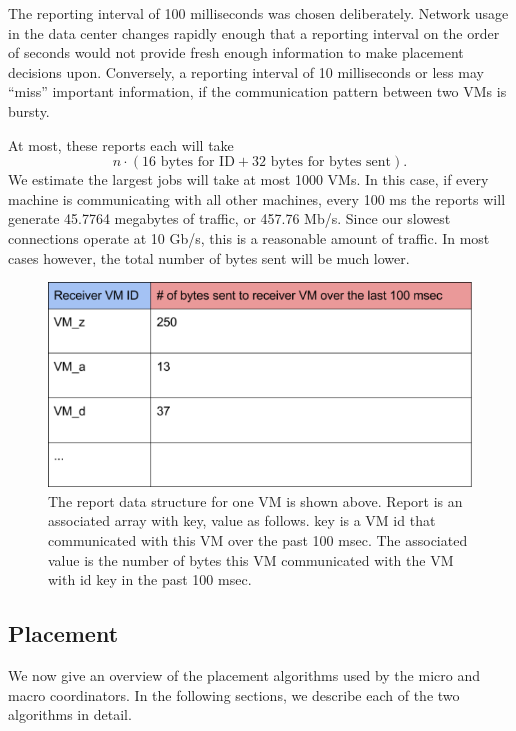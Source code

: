 \documentclass[11pt]{article}
\begin{document}
The reporting interval of 100 milliseconds was chosen deliberately.  Network usage in the data center changes rapidly enough that a reporting interval on the order of seconds would not provide fresh enough information to make placement decisions upon.  Conversely, a reporting interval of 10 milliseconds or less may ``miss'' important information, if the communication pattern between two VMs is bursty.

At most, these reports each will take
\[ n \cdot ( 16 \text{ bytes for ID} + 32 \text{ bytes for bytes sent}). \]
We estimate the largest jobs will take at most 1000 VMs.  In this case, if every machine is communicating with all other machines, every 100 ms the reports will generate 45.7764 megabytes of traffic, or 457.76 Mb/s.  Since our slowest connections operate at 10 Gb/s, this is a reasonable amount of traffic.  In most cases however, the total number of bytes sent will be much lower.

\begin{figure}
  \centering
\includegraphics[scale=0.65]{measurement.png}

 \caption{The report data structure for one VM is shown above. Report is an associated array with key, value as follows. key is a VM id that communicated with this VM over the past 100 msec. The associated value is the number of bytes this VM communicated with the VM with id key in the past 100 msec.}
 
 \label{fig:report}
\end{figure}

\subsection{Placement}

We now give an overview of the placement algorithms used by the micro and macro coordinators.  In the following sections, we describe each of the two algorithms in detail.
\end{document}
